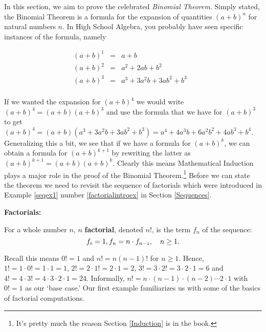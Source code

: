 \documentclass{ximera}
\begin{document}
	\author{Stitz-Zeager}




\setcounter{footnote}{0}

\label{Binomial}

In this section, we aim to prove the celebrated \textit{Binomial Theorem}.  Simply stated, the Binomial Theorem is a formula for the expansion of quantities $(a+b)^n$ for natural numbers $n$.  In High School Algebra, you probably have seen specific instances of the formula, namely

\[ \begin{array}{rclr}

(a+b)^1 & = & a + b & \\
(a+b)^2 & = & a^2 + 2ab + b^2 & \\
(a+b)^3 & = & a^3 + 3a^2 b + 3ab^2 + b^3 & \\
\end{array}\]

If we wanted the expansion for $(a+b)^4$ we would write $(a+b)^4 = (a+b)(a+b)^3$ and use the formula that we have for $(a+b)^3$ to get $(a+b)^4 = (a+b) \left( a^3 + 3a^2 b + 3ab^2 + b^3 \right) = a^4 + 4a^3b + 6a^2b^2 + 4ab^3 + b^4$.  Generalizing this a bit, we see that if we have a formula for $(a+b)^{k}$, we can obtain a formula for $(a+b)^{k+1}$ by rewriting the latter as $(a+b)^{k+1} = (a+b)(a+b)^{k}$.  Clearly this means Mathematical Induction plays a major role in the proof of the Binomial Theorem.\footnote{It's pretty much the reason Section \ref{Induction} is in the book.}  Before we can state the theorem we need to revisit the sequence of factorials which were introduced in Example \ref{seqex1} number \ref{factorialintroex} in Section \ref{Sequences}.

\medskip

\colorbox{ResultColor}{\bbm 

\begin{defn}  \label{factorialdefn}  \textbf{Factorials:}  

For a whole number $n$,  {\boldmath $n$} \textbf{factorial}, denoted $n!$,  is the term $f_{n}$ of the sequence: \[ f_{\mbox{\tiny$0$}} = 1, f_{n} =n \cdot f_{n-\mbox{\tiny$1$}}, \quad n \geq 1.\]


\end{defn}

\ebm}


\medskip

Recall this means $0! = 1$ and $n! = n(n-1)!$ for $n \geq 1$.  Hence, $1! = 1 \cdot 0! = 1 \cdot 1 = 1$, $2! = 2 \cdot 1! = 2 \cdot 1 = 2$, $3! = 3 \cdot 2! = 3 \cdot 2 \cdot 1 = 6$ and  $4! = 4 \cdot 3! = 4 \cdot 3 \cdot 2 \cdot 1 = 24$. Informally, $n! = n\cdot(n -1)\cdot(n -2) \cdots 2 \cdot 1$ with $0! = 1$ as our `base case.'  Our first example familiarizes us with some of the basics of factorial computations.
\end{document}
